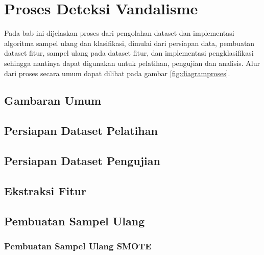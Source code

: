 \chapter{Proses Deteksi Vandalisme}
\label{bab:03}

Pada bab ini dijelaskan proses dari pengolahan dataset dan implementasi
algoritma sampel ulang dan klasifikasi, dimulai dari persiapan
data, pembuatan dataset fitur, sampel ulang pada dataset fitur, dan
implementasi pengklasifikasi sehingga nantinya dapat digunakan untuk pelatihan,
pengujian dan analisis.
Alur dari proses secara umum dapat dilihat pada gambar \ref{fig:diagramproses}.



	\section{Gambaran Umum}
	\label{bab:03:gambaran_umum}
	

	\section{Persiapan Dataset Pelatihan}
	\label{bab:03:persiapan_data_pelatihan}
	

	\section{Persiapan Dataset Pengujian}
	\label{bab:03:persiapan_data_pengujian}
	

	\section{Ekstraksi Fitur}
	\label{bab:03:ekstraksi_fitur}
	

	\section{Pembuatan Sampel Ulang}
	\label{bab:03:pembuatan_sampel_ulang}
	

	\subsection{Pembuatan Sampel Ulang SMOTE}
	\label{bab:03:sampel_ulang_smote}
	

